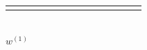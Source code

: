 \documentclass[12pt]{article}
\def\red{\textcolor{red}}
\numberwithin{equation}{section}
\def\red{\textcolor{red}}
\theoremstyle{plain}
\def\green{\textcolor{blue}}
\begin{document}
\begin{table}[h]
\begin{minipage}{0.45\textwidth}
\begin{tabular}{c|ccccccccccccc}
			& \makebox[0.7em][r]{$_{\green{6}}\red{3}$}
			& \makebox[0.7em][r]{$_{\green{7}}2$} 
			& \makebox[0.7em][r]{$_{\green{8}}2$} 
			& \makebox[0.7em][r]{$_{\green{5}}\red{4}$} 
			& \makebox[0.7em][r]{$_{\green{9}}1$} 
			& \makebox[0.7em][r]{$_{\green{4}}\red{4}$} 
			& \makebox[0.7em][r]{$_{\green{3}}\red{5}$} 
			& \makebox[0.7em][r]{$_{\green{10}}3$} 
			& \makebox[0.7em][r]{$_{\green{2}}1$} 
			& \makebox[0.7em][r]{$_{\green{1}}2$} 
			& \makebox[0.7em][r]{$_{\green{0}}1$}
			& \makebox[0em][r]{$_*$} \\
		\end{tabular}
		\\[0.5em] %
		{\small $w^{(1)}$} %
	\end{minipage}
\end{table}

\end{document}
